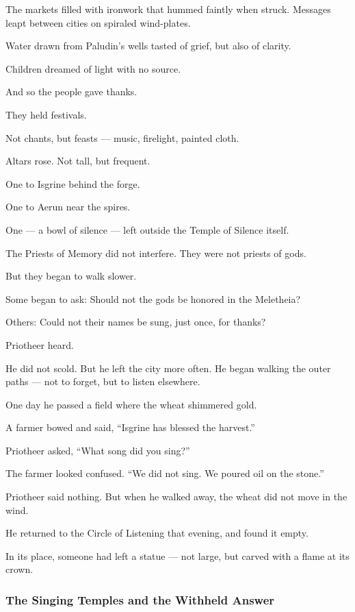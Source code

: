 \documentclass[12pt]{article}
\begin{document}
The markets filled with ironwork that hummed faintly when struck.  
Messages leapt between cities on spiraled wind-plates.  

Water drawn from Paludin’s wells tasted of grief, but also of clarity.  

Children dreamed of light with no source.

And so the people gave thanks.

They held festivals. 

Not chants, but feasts — music, firelight, painted cloth.

Altars rose. Not tall, but frequent.

One to Isgrine behind the forge.  

One to Aerun near the spires.  

One — a bowl of silence — left outside the Temple of Silence itself.

The Priests of Memory did not interfere.  
They were not priests of gods.

But they began to walk slower.

Some began to ask:  
Should not the gods be honored in the Meletheia?

Others:  
Could not their names be sung, just once, for thanks?

Priotheer heard.

He did not scold.  
But he left the city more often.  
He began walking the outer paths — not to forget, but to listen elsewhere.

One day he passed a field where the wheat shimmered gold.  

A farmer bowed and said, “Isgrine has blessed the harvest.”

Priotheer asked,  
“What song did you sing?”

The farmer looked confused.  
“We did not sing. We poured oil on the stone.”

Priotheer said nothing.  
But when he walked away, the wheat did not move in the wind.

He returned to the Circle of Listening that evening, and found it empty.

In its place, someone had left a statue — not large,  
but carved with a flame at its crown.

\dotfill

\subsubsection*{The Singing Temples and the Withheld Answer}
\end{document}
